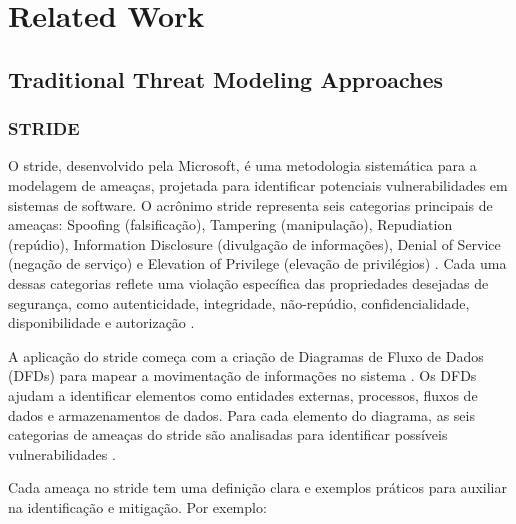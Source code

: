 
%

\chapter{Related Work}
\label{cha:related_work}

\glsresetall

\section{Traditional Threat Modeling Approaches}
\label{sec:traditional_threat_modeling}

\subsection{STRIDE}
\label{subsec:stride}

O \gls{stride}, desenvolvido pela Microsoft, é uma metodologia sistemática
para a modelagem de ameaças, projetada para identificar potenciais
vulnerabilidades em sistemas de software. O acrônimo \gls{stride} representa
seis categorias principais de ameaças: Spoofing (falsificação),
Tampering (manipulação), Repudiation (repúdio), Information Disclosure
(divulgação de informações), Denial of Service (negação de serviço) e
Elevation of Privilege (elevação de privilégios)
\cite{ThreatModelingdesigningForSecurity}. Cada uma dessas categorias
reflete uma violação específica das propriedades desejadas de
segurança, como autenticidade, integridade, não-repúdio,
confidencialidade, disponibilidade e autorização
\cite{MicrosoftThreatModelingTechnique}.

A aplicação do \gls{stride} começa com a criação de Diagramas de Fluxo de
Dados (DFDs) para mapear a movimentação de informações no sistema
\cite{UncoverSecurityDesignFlawsSTRIDE}. Os DFDs ajudam a identificar
elementos como entidades externas, processos, fluxos de dados e
armazenamentos de dados. Para cada elemento do diagrama, as seis
categorias de ameaças do \gls{stride} são analisadas para identificar
possíveis vulnerabilidades \cite{ThreatModelingdesigningForSecurity}.

Cada ameaça no \gls{stride} tem uma definição clara e exemplos práticos para
auxiliar na identificação e mitigação. Por exemplo:

